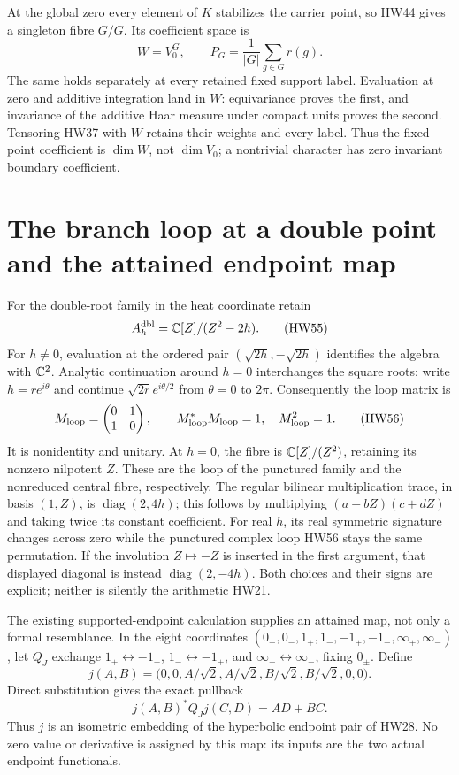At the global zero every element of \(K\) stabilizes the
carrier point, so HW44 gives a singleton fibre \(G/G\).
Its coefficient space is
\[
 W=V_0^G,\qquad P_G=\frac1{|G|}\sum_{g\in G}r(g).
 \tag{HW54}
\]
The same holds separately at every retained fixed support
label. Evaluation at zero and additive integration land in
\(W\): equivariance proves the first, and invariance of
the additive Haar measure under compact units proves the
second. Tensoring HW37 with \(W\) retains their weights
and every label. Thus the fixed-point coefficient is
\(\dim W\), not \(\dim V_0\); a nontrivial character has
zero invariant boundary coefficient.

\section{The branch loop at a double point and the attained endpoint map}

For the double-root family in the heat coordinate retain
\[
 A_h^{\rm dbl}=\mathbb C[Z]/(Z^2-2h).
 \tag{HW55}
\]
For \(h\ne0\), evaluation at the ordered pair
\((\sqrt{2h},-\sqrt{2h})\) identifies the algebra with
\(\mathbb C^2\). Analytic continuation around \(h=0\) interchanges
the square roots: write \(h=re^{i\theta}\) and continue
\(\sqrt{2r}e^{i\theta/2}\) from \(\theta=0\) to \(2\pi\).
Consequently the loop matrix is
\[
 M_{\rm loop}=\begin{pmatrix}0&1\\1&0\end{pmatrix},\qquad
 M_{\rm loop}^*M_{\rm loop}=1,\quad M_{\rm loop}^2=1 .
 \tag{HW56}
\]
It is nonidentity and unitary. At \(h=0\), the fibre is
\(\mathbb C[Z]/(Z^2)\), retaining its nonzero nilpotent \(Z\).
These are the loop of the punctured family and the
nonreduced central fibre, respectively.
The regular bilinear multiplication trace, in basis \((1,Z)\), is
\(\operatorname{diag}(2,4h)\); this follows by multiplying
\((a+bZ)(c+dZ)\) and taking twice its constant coefficient.
For real \(h\), its real symmetric signature changes across zero while
the punctured complex loop HW56 stays the same permutation.
If the involution \(Z\mapsto-Z\) is inserted in the first
argument, that displayed diagonal is instead
\(\operatorname{diag}(2,-4h)\). Both choices and their signs
are explicit; neither is silently the arithmetic HW21.

The existing supported-endpoint calculation supplies an
attained map, not only a formal resemblance. In the eight
coordinates \((0_+,0_-,1_+,1_-,-1_+,-1_-,\infty_+,\infty_-)\),
let \(Q_J\) exchange \(1_+\leftrightarrow-1_-\),
\(1_-\leftrightarrow-1_+\), and
\(\infty_+\leftrightarrow\infty_-\), fixing \(0_\pm\).
Define
\[
 j(A,B)=\bigl(0,0,A/\sqrt2,A/\sqrt2,
                       B/\sqrt2,B/\sqrt2,0,0\bigr).
 \tag{HW57}
\]
Direct substitution gives the exact pullback
\[
 j(A,B)^*Q_Jj(C,D)=\bar A D+\bar B C .
 \tag{HW58}
\]
Thus \(j\) is an isometric embedding of the hyperbolic
endpoint pair of HW28. No zero value or derivative is
assigned by this map: its inputs are the two actual
endpoint functionals.

